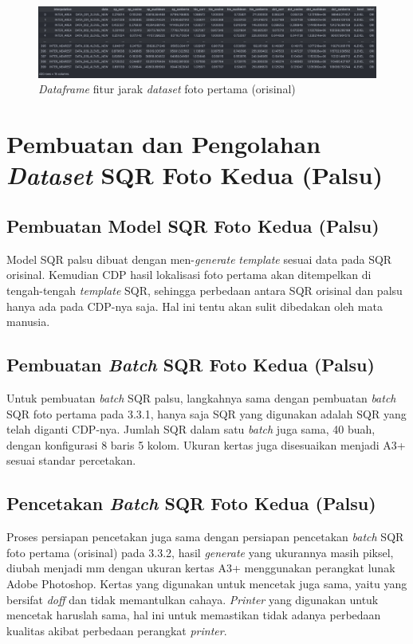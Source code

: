 \begin{figure}[h]
	\centering
	\includegraphics[width=13cm]{contents/chapter-3/3-dataframefitur.png}
	\caption{\emph{Dataframe} fitur jarak \emph{dataset} foto pertama (orisinal)}
	\label{Fig: 3-dataframefitur}
\end{figure}

\section{Pembuatan dan Pengolahan \emph{Dataset} SQR Foto Kedua (Palsu)}
\subsection{Pembuatan Model SQR Foto Kedua (Palsu)}
Model SQR palsu dibuat dengan men-\emph{generate} \emph{template} sesuai data pada SQR orisinal. Kemudian CDP hasil lokalisasi foto pertama akan ditempelkan di
tengah-tengah \emph{template} SQR, sehingga perbedaan antara SQR orisinal dan palsu hanya ada pada CDP-nya saja. Hal ini tentu akan sulit dibedakan oleh mata
manusia.

\subsection{Pembuatan \emph{Batch} SQR Foto Kedua (Palsu)} Untuk pembuatan \emph{batch} SQR palsu, langkahnya sama dengan pembuatan \emph{batch} SQR foto pertama pada 3.3.1, hanya saja SQR yang
digunakan adalah SQR yang telah diganti CDP-nya. Jumlah SQR dalam satu \emph{batch} juga sama, 40 buah, dengan konfigurasi 8 baris 5 kolom. Ukuran kertas juga
disesuaikan menjadi A3+ sesuai standar percetakan.

\subsection{Pencetakan \emph{Batch} SQR Foto Kedua (Palsu)}
Proses persiapan pencetakan juga sama dengan persiapan pencetakan \emph{batch} SQR foto pertama (orisinal) pada 3.3.2, hasil \emph{generate} yang ukurannya masih piksel, diubah menjadi mm dengan ukuran kertas A3+ menggunakan perangkat lunak Adobe Photoshop. Kertas yang digunakan untuk mencetak juga sama, yaitu yang bersifat \emph{doff} dan tidak memantulkan cahaya. \emph{Printer} yang digunakan untuk mencetak haruslah sama, hal ini untuk memastikan tidak adanya perbedaan kualitas akibat perbedaan perangkat \emph{printer}.

